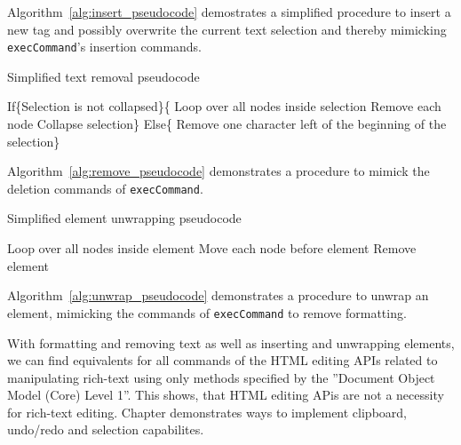 Algorithm~\ref{alg:insert_pseudocode} demostrates a simplified procedure to insert a new tag and possibly overwrite the current text selection and thereby mimicking \texttt{execCommand}'s insertion commands.

\begin{algorithm}
\caption{Simplified text removal pseudocode}
\label{alg:remove_pseudocode}
\begin{algorithmic}[1]
\State If\{Selection is not collapsed\}\{
\State Loop over all nodes inside selection
\State Remove each node
\State Collapse selection\}
\State Else\{
\State Remove one character left of the beginning of the selection\}
\end{algorithmic}
\end{algorithm}

Algorithm~\ref{alg:remove_pseudocode} demonstrates a procedure to mimick the deletion commands of \texttt{execCommand}.

\begin{algorithm}
\caption{Simplified element unwrapping pseudocode}
\label{alg:unwrap_pseudocode}
\begin{algorithmic}[1]
\State Loop over all nodes inside element
\State Move each node before element
\State Remove element
\end{algorithmic}
\end{algorithm}

Algorithm~\ref{alg:unwrap_pseudocode} demonstrates a procedure to unwrap an element, mimicking the commands of \texttt{execCommand} to remove formatting.

With formatting and removing text as well as inserting and unwrapping elements, we can find equivalents for all commands of the HTML editing APIs related to manipulating rich-text using only methods specified by the ''Document Object Model (Core) Level 1''. This shows, that HTML editing APis are not a necessity for rich-text editing. Chapter  demonstrates ways to implement clipboard, undo/redo and selection capabilites.


